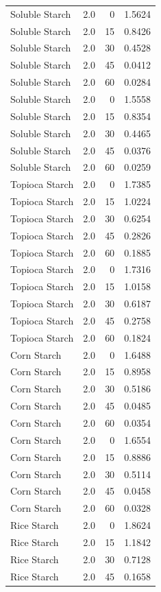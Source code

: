 \documentclass[
  12pt,
]{article}
\begin{document}
{\begin{longtable}[]{@{}lrrr@{}}
Soluble Starch & 2.0 & 0 & 1.5624 \\
Soluble Starch & 2.0 & 15 & 0.8426 \\
Soluble Starch & 2.0 & 30 & 0.4528 \\
Soluble Starch & 2.0 & 45 & 0.0412 \\
Soluble Starch & 2.0 & 60 & 0.0284 \\
Soluble Starch & 2.0 & 0 & 1.5558 \\
Soluble Starch & 2.0 & 15 & 0.8354 \\
Soluble Starch & 2.0 & 30 & 0.4465 \\
Soluble Starch & 2.0 & 45 & 0.0376 \\
Soluble Starch & 2.0 & 60 & 0.0259 \\
Topioca Starch & 2.0 & 0 & 1.7385 \\
Topioca Starch & 2.0 & 15 & 1.0224 \\
Topioca Starch & 2.0 & 30 & 0.6254 \\
Topioca Starch & 2.0 & 45 & 0.2826 \\
Topioca Starch & 2.0 & 60 & 0.1885 \\
Topioca Starch & 2.0 & 0 & 1.7316 \\
Topioca Starch & 2.0 & 15 & 1.0158 \\
Topioca Starch & 2.0 & 30 & 0.6187 \\
Topioca Starch & 2.0 & 45 & 0.2758 \\
Topioca Starch & 2.0 & 60 & 0.1824 \\
Corn Starch & 2.0 & 0 & 1.6488 \\
Corn Starch & 2.0 & 15 & 0.8958 \\
Corn Starch & 2.0 & 30 & 0.5186 \\
Corn Starch & 2.0 & 45 & 0.0485 \\
Corn Starch & 2.0 & 60 & 0.0354 \\
Corn Starch & 2.0 & 0 & 1.6554 \\
Corn Starch & 2.0 & 15 & 0.8886 \\
Corn Starch & 2.0 & 30 & 0.5114 \\
Corn Starch & 2.0 & 45 & 0.0458 \\
Corn Starch & 2.0 & 60 & 0.0328 \\
Rice Starch & 2.0 & 0 & 1.8624 \\
Rice Starch & 2.0 & 15 & 1.1842 \\
Rice Starch & 2.0 & 30 & 0.7128 \\
Rice Starch & 2.0 & 45 & 0.1658 \\

\end{longtable}}
\end{document}

